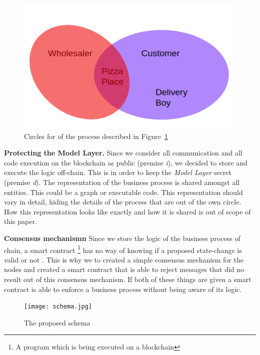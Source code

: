 \documentclass[runningheads]{llncs}
\newcommand{\ber}[1]{\textit{#1}}
\newcommand{\reffig}[1]{Figure~\ref{#1}}
\begin{document}
\begin{figure}[h!]
    \centering
    \includegraphics[scale=0.6]{cicles.png}
    \caption{Circles for of the process described in \reffig{fig:circles}} 
    \label{fig:circles}
\end{figure}



\bigbreak
\textbf{Protecting the Model Layer.} Since we consider all communication and all code execution on the blockchain as public (premise \ber{i}), we decided to store and execute the logic off-chain. This is in order to keep the \ber{Model Layer} secret (premise \ber{d}). The representation of the business process is shared amongst all entities. This could be a graph or executable code. This representation should vary in detail, hiding the details of the process that are out of the own circle. How this representation looks like exactly and how it is shared is out of scope of this paper.


\bigbreak
\textbf{Consensus mechanismn} Since we store the logic of the business process of chain, a smart 
 contract \footnote{A program which is being executed on a blockchain} has no way of knowing if a proposed state-change is valid or not . This is why we to created a simple consensus mechanism for the nodes and created a smart contract that is able to reject messages that did no result out of this consensus mechanism. If both of these things are given a smart contract is able to enforce a business process without being aware of its logic.


\begin{figure}[h!]
    \centering
    \texttt{[image: schema.jpg]}
    \caption{The proposed schema} 
    \label{fig:schema}
\end{figure}
\end{document}
